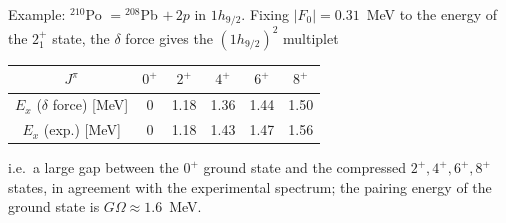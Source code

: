 \documentclass[11pt,a4paper]{article}
\begin{document}
Example: ${}^{210}$Po $={}^{208}$Pb $+\,2p$ in $1h_{9/2}$. Fixing $|F_0|=0.31$~MeV to the energy of the $2^+_1$ state, the $\delta$ force gives the $(1h_{9/2})^2$ multiplet
\begin{center}
\begin{tabular}{c c c c c c}
$J^\pi$ & $0^+$ & $2^+$ & $4^+$ & $6^+$ & $8^+$\\ \hline
$E_x$ ($\delta$ force) [MeV] & 0 & 1.18 & 1.36 & 1.44 & 1.50\\
$E_x$ (exp.) [MeV] & 0 & 1.18 & 1.43 & 1.47 & 1.56
\end{tabular}
\end{center}
i.e.\ a large gap between the $0^+$ ground state and the compressed $2^+,4^+,6^+,8^+$ states, in agreement with the experimental spectrum; the pairing energy of the ground state is $G\Omega\approx1.6$~MeV.
\end{document}
